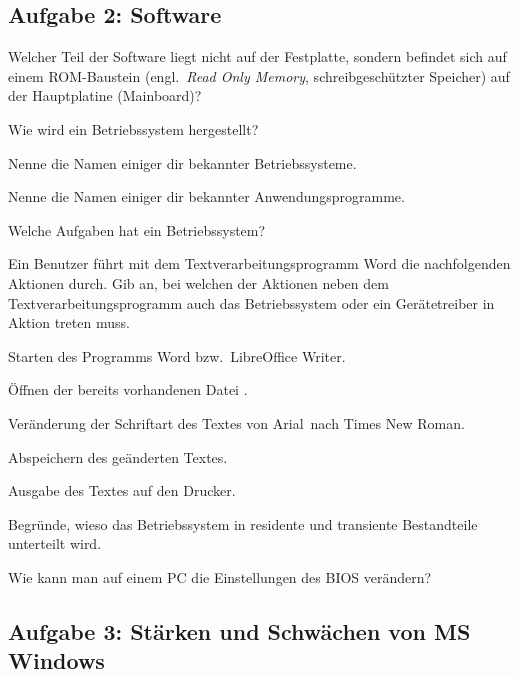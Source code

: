 \subsection{Aufgabe 2: Software}

\begin{compactenum}[a)]
\item Welcher Teil der Software liegt nicht auf der Festplatte, sondern
befindet sich auf einem ROM-Baustein (engl.\ \emph{Read Only Memory},
schreibgeschützter Speicher) auf der Hauptplatine (Mainboard)?

\item Wie wird ein Betriebssystem hergestellt?

\item Nenne die Namen einiger dir bekannter Betriebssysteme.

\item Nenne die Namen einiger dir bekannter Anwendungsprogramme.

\item Welche Aufgaben hat ein Betriebssystem?

\item Ein Benutzer führt mit dem Textverarbeitungsprogramm Word die
nachfolgenden Aktionen durch. Gib an, bei welchen der Aktionen neben dem
Textverarbeitungsprogramm auch das Betriebssystem oder ein Gerätetreiber in
Aktion treten muss.

\begin{compactenum}[1.]
\item Starten des Programms Word bzw.\ LibreOffice Writer.
\item Öffnen der bereits vorhandenen Datei .
\item Veränderung der Schriftart des Textes von \glqq Arial\grqq\ nach
\glqq Times New Roman\grqq .
\item Abspeichern des geänderten Textes.
\item Ausgabe des Textes auf den Drucker.
\end{compactenum}

\item Begründe, wieso das Betriebssystem in residente und transiente Bestandteile
 unterteilt wird.
 
\item Wie kann man auf einem PC die Einstellungen des BIOS verändern?
\end{compactenum}


\subsection{Aufgabe 3: Stärken und Schwächen von MS Windows}


